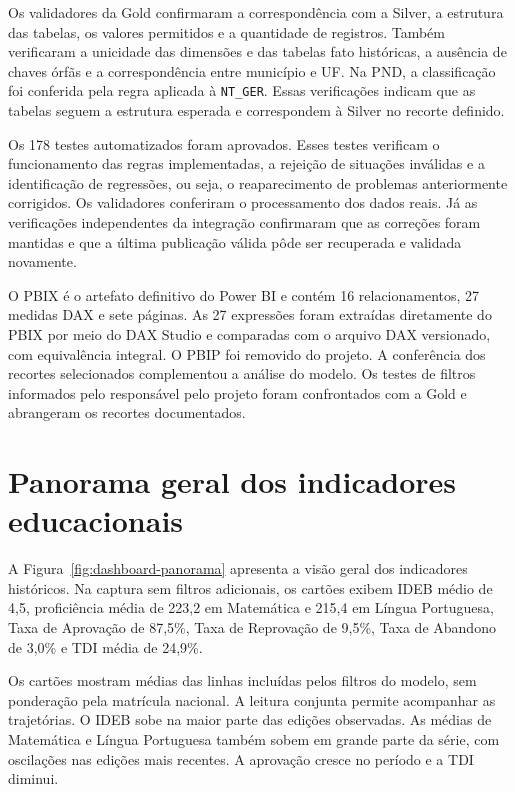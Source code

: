 Os validadores da Gold confirmaram a correspondência com a Silver, a estrutura das tabelas, os valores permitidos e a quantidade de registros. Também verificaram a unicidade das dimensões e das tabelas fato históricas, a ausência de chaves órfãs e a correspondência entre município e UF. Na PND, a classificação foi conferida pela regra aplicada à \texttt{NT\_GER}. Essas verificações indicam que as tabelas seguem a estrutura esperada e correspondem à Silver no recorte definido.

Os 178 testes automatizados foram aprovados. Esses testes verificam o funcionamento das regras implementadas, a rejeição de situações inválidas e a identificação de regressões, ou seja, o reaparecimento de problemas anteriormente corrigidos. Os validadores conferiram o processamento dos dados reais. Já as verificações independentes da integração confirmaram que as correções foram mantidas e que a última publicação válida pôde ser recuperada e validada novamente.

O PBIX é o artefato definitivo do Power BI e contém 16 relacionamentos, 27 medidas DAX e sete páginas. As 27 expressões foram extraídas diretamente do PBIX por meio do DAX Studio e comparadas com o arquivo DAX versionado, com equivalência integral. O PBIP foi removido do projeto. A conferência dos recortes selecionados complementou a análise do modelo. Os testes de filtros informados pelo responsável pelo projeto foram confrontados com a Gold e abrangeram os recortes documentados.

\section{Panorama geral dos indicadores educacionais}

A Figura~\ref{fig:dashboard-panorama} apresenta a visão geral dos indicadores históricos. Na captura sem filtros adicionais, os cartões exibem IDEB médio de 4,5, proficiência média de 223,2 em Matemática e 215,4 em Língua Portuguesa, Taxa de Aprovação de 87,5\%, Taxa de Reprovação de 9,5\%, Taxa de Abandono de 3,0\% e TDI média de 24,9\%.

Os cartões mostram médias das linhas incluídas pelos filtros do modelo, sem ponderação pela matrícula nacional. A leitura conjunta permite acompanhar as trajetórias. O IDEB sobe na maior parte das edições observadas. As médias de Matemática e Língua Portuguesa também sobem em grande parte da série, com oscilações nas edições mais recentes. A aprovação cresce no período e a TDI diminui.


